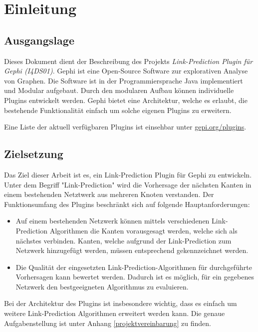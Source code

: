 \chapter{Einleitung}

\section{Ausgangslage}
Dieses Dokument dient der Beschreibung des Projekts \textit{Link-Prediction Plugin für Gephi (I4DS01)}.
Gephi ist eine Open-Source Software zur explorativen Analyse von Graphen. Die Software ist in der Programmiersprache Java implementiert und Modular aufgebaut. Durch den modularen Aufbau können individuelle Plugins entwickelt werden. Gephi bietet eine Architektur, welche es erlaubt, die bestehende Funktionalität einfach um solche eigenen Plugins zu erweitern.

Eine Liste der aktuell verfügbaren Plugins ist einsehbar unter \href{https://gephi.org/plugins}{gepi.org/plugins}.

\section{Zielsetzung}

Das Ziel dieser Arbeit ist es, ein Link-Prediction Plugin für Gephi zu entwickeln. Unter dem Begriff "Link-Prediction" wird die Vorhersage der nächsten Kanten in einem bestehenden Netztwerk aus mehreren Knoten verstanden.
Der Funktionsumfang des Plugins beschränkt sich auf folgende Hauptanforderungen:

\begin{itemize}
    \item Auf einem bestehenden Netzwerk können mittels verschiedenen Link-Prediction Algorithmen die Kanten vorausgesagt werden, welche sich als nächstes verbinden. Kanten, welche aufgrund der Link-Prediction zum Netzwerk hinzugefügt werden, müssen entsprechend gekennzeichnet werden.
    \item Die Qualität der eingesetzten Link-Prediction-Algorithmen für durchgeführte Vorhersagen kann bewertet werden. Dadurch ist es möglich, für ein gegebenes Netzwerk den bestgeeigneten Algorithmus zu evaluieren.
\end{itemize}

Bei der Architektur des Plugins ist insbesondere wichtig, dass es einfach um weitere Link-Prediction Algorithmen erweitert werden kann.
Die genaue Aufgabenstellung ist unter Anhang \ref{projektvereinbarung} zu finden.

